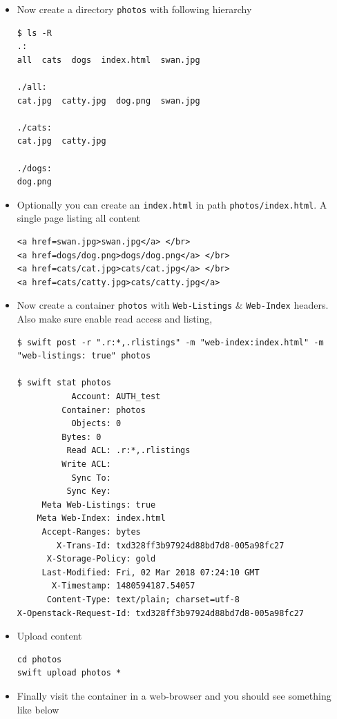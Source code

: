 \documentclass{article}
\begin{document}
\begin{itemize}
\begin{itemize}
\item Now create a directory \texttt{photos} with following hierarchy
\begin{verbatim}
$ ls -R
.:
all  cats  dogs  index.html  swan.jpg

./all:
cat.jpg  catty.jpg  dog.png  swan.jpg

./cats:
cat.jpg  catty.jpg

./dogs:
dog.png
\end{verbatim}

\item Optionally you can create an \texttt{index.html} in path
\texttt{photos/index.html}. A single page listing all content
\begin{verbatim}
<a href=swan.jpg>swan.jpg</a> </br>
<a href=dogs/dog.png>dogs/dog.png</a> </br>
<a href=cats/cat.jpg>cats/cat.jpg</a> </br>
<a href=cats/catty.jpg>cats/catty.jpg</a>
\end{verbatim}

\item Now create a container \texttt{photos} with \texttt{Web-Listings} \& \texttt{Web-Index}
headers. Also make sure enable read access and listing,
\begin{verbatim}
$ swift post -r ".r:*,.rlistings" -m "web-index:index.html" -m "web-listings: true" photos

$ swift stat photos
	       Account: AUTH_test
	     Container: photos
	       Objects: 0
		 Bytes: 0
	      Read ACL: .r:*,.rlistings
	     Write ACL:
	       Sync To:
	      Sync Key:
     Meta Web-Listings: true
	Meta Web-Index: index.html
	 Accept-Ranges: bytes
	    X-Trans-Id: txd328ff3b97924d88bd7d8-005a98fc27
      X-Storage-Policy: gold
	 Last-Modified: Fri, 02 Mar 2018 07:24:10 GMT
	   X-Timestamp: 1480594187.54057
	  Content-Type: text/plain; charset=utf-8
X-Openstack-Request-Id: txd328ff3b97924d88bd7d8-005a98fc27
\end{verbatim}

\item Upload content
\begin{verbatim}
cd photos
swift upload photos *
\end{verbatim}

\item Finally visit the container in a web-browser and you should see
something like below


\end{itemize}
\end{itemize}
\end{document}
